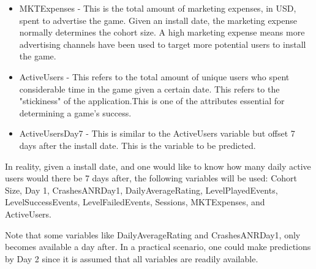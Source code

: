 \begin{itemize}
\item MKTExpenses - This is the total amount of marketing expenses, in USD, spent to advertise the game. Given an install date, the marketing expense normally determines the cohort size. A high marketing expense means more advertising channels have been used to target more potential users to install the game.
\item ActiveUsers - This refers to the total amount of unique users who spent considerable time in the game given a certain date. This refers to the "stickiness" of the application.This is one of the attributes essential for determining a game's success.
\item ActiveUsersDay7 - This is similar to the ActiveUsers variable but offset 7 days after the install date. This is the variable to be predicted. 
\end{itemize}

In reality, given a install date, and one would like to know how many daily active users would there be 7 days after, the following variables will be used: Cohort Size, Day 1, CrashesANRDay1, DailyAverageRating, LevelPlayedEvents, LevelSuccessEvents, LevelFailedEvents, Sessions, MKTExpenses, and ActiveUsers.

Note that some variables like DailyAverageRating and CrashesANRDay1, only becomes available a day after. In a practical scenario, one could make predictions by Day 2 since it is assumed that all variables are readily available.